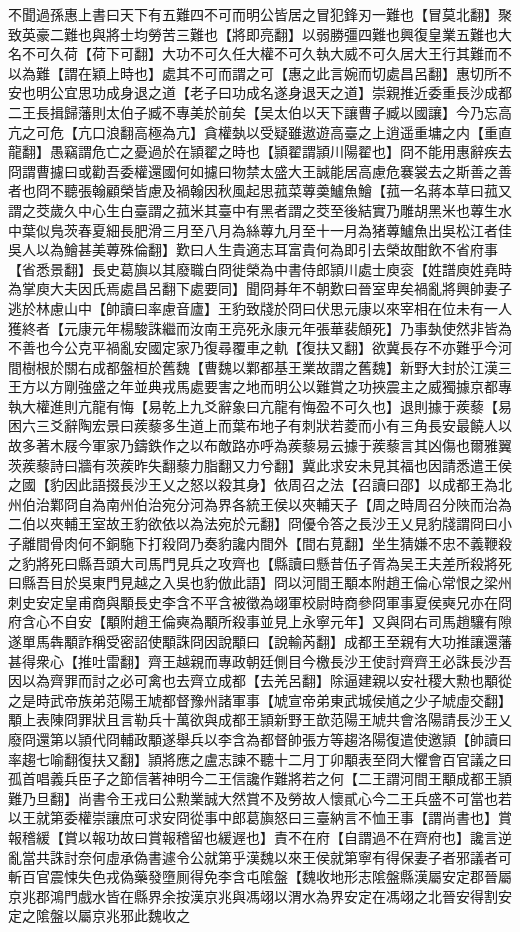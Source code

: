 不聞過孫惠上書曰天下有五難四不可而明公皆居之冒犯鋒刃一難也【冒莫北翻】聚致英豪二難也與將士均勞苦三難也【將即亮翻】以弱勝彊四難也興復皇業五難也大名不可久荷【荷下可翻】大功不可久任大權不可久執大威不可久居大王行其難而不以為難【謂在穎上時也】處其不可而謂之可【惠之此言婉而切處昌呂翻】惠切所不安也明公宜思功成身退之道【老子曰功成名遂身退天之道】崇親推近委重長沙成都二王長揖歸藩則太伯子臧不專美於前矣【吴太伯以天下讓曹子臧以國讓】今乃忘高亢之可危【亢口浪翻高極為亢】貪權埶以受疑雖遨遊高臺之上逍遥重墉之内【重直龍翻】愚竊謂危亡之憂過於在頴翟之時也【頴翟謂頴川陽翟也】冏不能用惠辭疾去冏謂曹攄曰或勸吾委權還國何如攄曰物禁太盛大王誠能居高慮危褰裳去之斯善之善者也冏不聽張翰顧榮皆慮及禍翰因秋風起思菰菜蓴羮鱸魚鱠【菰一名蔣本草曰菰又謂之茭歲久中心生白臺謂之菰米其臺中有黑者謂之茭至後結實乃雕胡黑米也蓴生水中葉似鳬茨春夏細長肥滑三月至八月為絲蓴九月至十一月為猪蓴鱸魚出吳松江者佳吳人以為鱠甚美蓴殊倫翻】歎曰人生貴適志耳富貴何為即引去榮故酣飲不省府事【省悉景翻】長史葛旟以其廢職白冏徙榮為中書侍郎頴川處士庾衮【姓譜庾姓堯時為掌庾大夫因氏焉處昌呂翻下處要同】聞冏朞年不朝歎曰晉室卑矣禍亂將興帥妻子逃於林慮山中【帥讀曰率慮音廬】王豹致牋於冏曰伏思元康以來宰相在位未有一人獲終者【元康元年楊駿誅繼而汝南王亮死永康元年張華裴頠死】乃事埶使然非皆為不善也今公克平禍亂安國定家乃復尋覆車之軌【復扶又翻】欲冀長存不亦難乎今河間樹根於關右成都盤桓於舊魏【曹魏以鄴都基王業故謂之舊魏】新野大封於江漢三王方以方剛強盛之年並典戎馬處要害之地而明公以難賞之功挾震主之威獨據京都專執大權進則亢龍有悔【易乾上九爻辭象曰亢龍有悔盈不可久也】退則據于蒺藜【易困六三爻辭陶宏景曰蒺藜多生道上而葉布地子有刺狀若菱而小有三角長安最饒人以故多著木屐今軍家乃鑄鉄作之以布敵路亦呼為蒺藜易云據于蒺藜言其凶傷也爾雅翼茨蒺藜詩曰牆有茨蒺昨失翻藜力脂翻又力兮翻】冀此求安未見其福也因請悉遣王侯之國【豹因此語掇長沙王乂之怒以殺其身】依周召之法【召讀曰邵】以成都王為北州伯治鄴冏自為南州伯治宛分河為界各統王侯以夾輔天子【周之時周召分陜而治為二伯以夾輔王室故王豹欲依以為法宛於元翻】冏優令答之長沙王乂見豹牋謂冏曰小子離間骨肉何不銅駞下打殺冏乃奏豹讒内間外【間右莧翻】坐生猜嫌不忠不義鞭殺之豹將死曰縣吾頭大司馬門見兵之攻齊也【縣讀曰懸昔伍子胥為吴王夫差所殺將死曰縣吾目於吳東門見越之入吳也豹倣此語】冏以河間王顒本附趙王倫心常恨之梁州刺史安定皇甫商與顒長史李含不平含被徵為翊軍校尉時商參冏軍事夏侯奭兄亦在冏府含心不自安【顒附趙王倫奭為顒所殺事並見上永寧元年】又與冏右司馬趙驤有隙遂單馬犇顒詐稱受密詔使顒誅冏因說顒曰【說輸芮翻】成都王至親有大功推讓還藩甚得衆心【推吐雷翻】齊王越親而專政朝廷側目今檄長沙王使討齊齊王必誅長沙吾因以為齊罪而討之必可禽也去齊立成都【去羌呂翻】除逼建親以安社稷大勲也顒從之是時武帝族弟范陽王虓都督豫州諸軍事【虓宣帝弟東武城侯馗之少子虓虛交翻】顒上表陳冏罪狀且言勒兵十萬欲與成都王頴新野王歆范陽王虓共會洛陽請長沙王乂廢冏還第以頴代冏輔政顒遂舉兵以李含為都督帥張方等趨洛陽復遣使邀頴【帥讀曰率趨七喻翻復扶又翻】頴將應之盧志諫不聽十二月丁卯顒表至冏大懼會百官議之曰孤首唱義兵臣子之節信著神明今二王信讒作難將若之何【二王謂河間王顒成都王頴難乃旦翻】尚書令王戎曰公勲業誠大然賞不及勞故人懷貳心今二王兵盛不可當也若以王就第委權崇讓庶可求安冏從事中郎葛旟怒曰三臺納言不恤王事【謂尚書也】賞報稽緩【賞以報功故曰賞報稽留也緩遟也】責不在府【自謂過不在齊府也】讒言逆亂當共誅討奈何虛承偽書遽令公就第乎漢魏以來王侯就第寧有得保妻子者邪議者可斬百官震悚失色戎偽藥發墮厠得免李含屯隂盤【魏收地形志隂盤縣漢屬安定郡晉屬京兆郡鴻門戲水皆在縣界余按漢京兆與馮翊以渭水為界安定在馮翊之北晉安得割安定之隂盤以屬京兆邪此魏收之